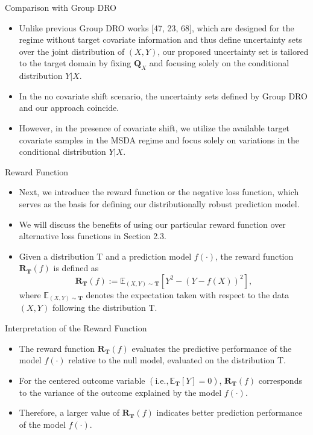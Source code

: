 \documentclass{beamer}
\begin{document}
\begin{frame}{Comparison with Group DRO}
    \begin{itemize}
        \item Unlike previous Group DRO works [47, 23, 68], which are designed for the regime without target covariate information and thus define uncertainty sets over the joint distribution of $(X, Y)$, our proposed uncertainty set is tailored to the target domain by fixing $\mathbf{Q}_X$ and focusing solely on the conditional distribution $Y | X$.
        \item In the no covariate shift scenario, the uncertainty sets defined by Group DRO and our approach coincide.
        \item However, in the presence of covariate shift, we utilize the available target covariate samples in the MSDA regime and focus solely on variations in the conditional distribution $Y | X$.
    \end{itemize}
\end{frame}

\begin{frame}{Reward Function}
    \begin{itemize}
        \item Next, we introduce the reward function or the negative loss function, which serves as the basis for defining our distributionally robust prediction model.
        \item We will discuss the benefits of using our particular reward function over alternative loss functions in Section 2.3.
        \item Given a distribution T and a prediction model $f(\cdot)$, the reward function $\mathbf{R}_{\mathbf{T}}(f)$ is defined as
        \[
        \mathbf{R}_{\mathbf{T}}(f) := \mathbb{E}_{(X, Y) \sim \mathbf{T}} [ Y^{2} - (Y - f(X))^{2} ], 
        \]
        where $\mathbb{E}_{(X, Y) \sim \mathbf{T}}$ denotes the expectation taken with respect to the data $(X, Y)$ following the distribution T.
    \end{itemize}
\end{frame}

\begin{frame}{Interpretation of the Reward Function}
    \begin{itemize}
        \item The reward function $\mathbf{R}_{\mathbf{T}}(f)$ evaluates the predictive performance of the model $f(\cdot)$ relative to the null model, evaluated on the distribution T.
        \item For the centered outcome variable $(\mathrm{i.e., \mathbb{E}_{\mathbf{T}}}[Y] = 0)$, $\mathbf{R}_{\mathbf{T}}(f)$ corresponds to the variance of the outcome explained by the model $f(\cdot)$.
        \item Therefore, a larger value of $\mathbf{R}_{\mathbf{T}}(f)$ indicates better prediction performance of the model $f(\cdot)$.
    \end{itemize}
\end{frame}
\end{document}
